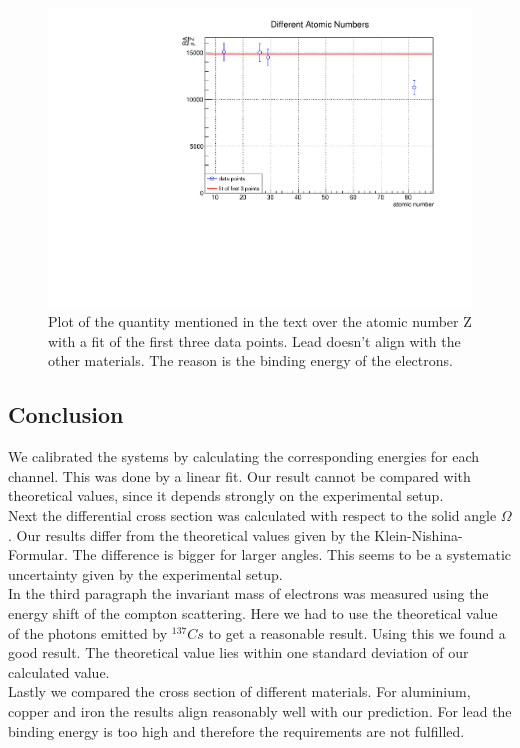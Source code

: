 \begin{figure}[h]
\centering
\includegraphics[scale=0.5]{./../plots/part_c.pdf}
\caption{Plot of the quantity mentioned in the text over the atomic number Z with a fit of the first three data points. Lead doesn't align with the other materials. The reason is the binding energy of the electrons.}
\end{figure}

\newpage

\subsection{Conclusion}

We calibrated the systems by calculating the corresponding energies for each channel. This was done by a linear fit. Our result cannot be compared with theoretical values, since it depends strongly on the experimental setup. \\
Next the differential cross section was calculated with respect to the solid angle $\Omega$. Our results differ from the theoretical values given by the Klein-Nishina-Formular. The difference is bigger for larger angles. This seems to be a systematic uncertainty given by the experimental setup. \\
In the third paragraph the invariant mass of electrons was measured using the energy shift of the compton scattering. Here we had to use the theoretical value of the photons emitted by ${}^{137}Cs$ to get a reasonable result. Using this we found a good result. The theoretical value lies within one standard deviation of our calculated value. \\
Lastly we compared the cross section of different materials. For aluminium, copper and iron the results align reasonably well with our prediction. For lead the binding energy is too high and therefore the requirements are not fulfilled.
